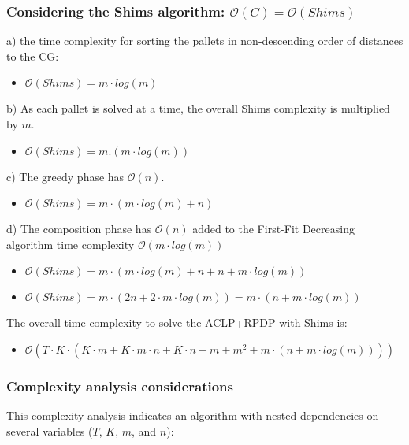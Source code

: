 \documentclass[preprint,authoryear]{elsarticle}
\begin{document}
{\subsubsection{Considering the Shims algorithm: $\mathcal{O}(C) = \mathcal{O}(Shims)$}

a) the time complexity for sorting the pallets in non-descending order of distances to the CG:
\begin{itemize}
	\item $\mathcal{O}(Shims) = m \cdot log(m)$
\end{itemize}

b) As each pallet is solved at a time, the overall Shims complexity is multiplied by $m$.
\begin{itemize}
	\item $\mathcal{O}(Shims) = m.(m \cdot log(m))$
\end{itemize}

c) The greedy phase has $\mathcal{O}(n)$.
\begin{itemize}
	\item $\mathcal{O}(Shims) = m \cdot (m \cdot log(m) + n)$
\end{itemize}

d) The composition phase has $\mathcal{O}(n)$ added to the First-Fit Decreasing algorithm time complexity $\mathcal{O}(m \cdot log(m))$
\begin{itemize}
	\item $\mathcal{O}(Shims) = m \cdot (m \cdot log(m) + n + n + m \cdot log(m))$
	\item $\mathcal{O}(Shims) = m \cdot (2n + 2 \cdot m \cdot log(m)) = m \cdot (n + m \cdot log(m))$
\end{itemize}

The overall time complexity to solve the ACLP+RPDP with Shims is:
\begin{itemize}
	\item $\mathcal{O}(T \cdot K \cdot (K \cdot m + K \cdot m \cdot n + K \cdot n + m + m^2 + m \cdot (n + m \cdot log(m))))$	
\end{itemize}


\subsubsection{Complexity analysis considerations}

This complexity analysis indicates an algorithm with nested dependencies on several variables ($T$, $K$, $m$, and $n$):

}
\end{document}
